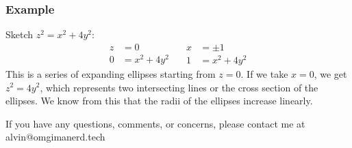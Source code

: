 \documentclass[letterpaper, 12pt]{math}
\begin{document}
\subsubsection*{Example}
Sketch \( z^2 = x^2+4y^2 \):
\[ \begin{split}
  z &= 0 \\
  0 &= x^2+4y^2
\end{split}\quad\begin{split}
  x &= \pm1 \\
  1 &= x^2+4y^2
\end{split} \]
This is a series of expanding ellipses starting from \( z = 0 \). If we take
\( x = 0 \), we get \( z^2 = 4y^2 \), which represents two intersecting lines
or the cross section of the ellipses. We know from this that the radii of the
ellipses increase linearly.

\begin{center}
  If you have any questions, comments, or concerns, please contact me at
  alvin@omgimanerd.tech
\end{center}
\end{document}
